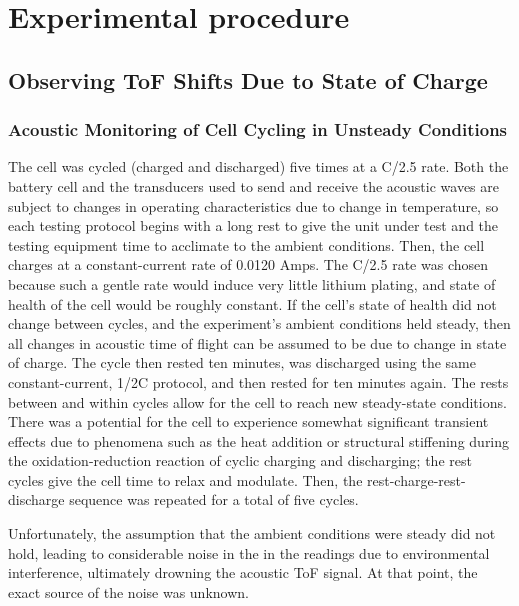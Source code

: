 
\chapter{Experimental procedure}

\section{Observing ToF Shifts Due to State of Charge}

\subsection{Acoustic Monitoring of Cell Cycling in Unsteady Conditions}

The cell was cycled (charged and discharged) five times at a C/2.5 rate. 
Both the battery cell and the transducers used to send and receive the acoustic waves are subject to changes in operating characteristics due to change in temperature, so each testing protocol begins with a long rest to give the unit under test and the testing equipment time to acclimate to the ambient conditions. 
Then, the cell charges at a constant-current rate of 0.0120 Amps. 
The C/2.5 rate was chosen because such a gentle rate would induce very little lithium plating, and state of health of the cell would be roughly constant. 
If the cell's state of health did not change between cycles, and the experiment's ambient conditions held steady, then all changes in acoustic time of flight can be assumed to be due to change in state of charge.
The cycle then rested ten minutes, was discharged using the same constant-current, 1/2C protocol, and then rested for ten minutes again. 
The rests between and within cycles allow for the cell to reach new steady-state conditions. 
There was a potential for the cell to experience somewhat significant transient effects due to phenomena such as the heat addition or structural stiffening during the oxidation-reduction reaction of cyclic charging and discharging; the rest cycles give the cell time to relax and modulate.
Then, the rest-charge-rest-discharge sequence was repeated for a total of five cycles.


Unfortunately, the assumption that the ambient conditions were steady did not hold, leading to considerable noise in the in the readings due to environmental interference, ultimately drowning the acoustic ToF signal. At that point, the exact source of the noise was unknown.

